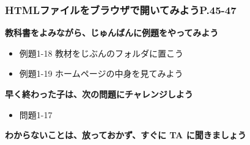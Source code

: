 \documentclass[dvipdfmx]{beamer}
\begin{document}
\begin{frame}[fragile]
	\frametitle{\large{HTMLファイルをブラウザで開いてみようP.45-47}~~~}
      \large\textbf{教科書をよみながら、じゅんばんに例題をやってみよう}
				\begin{itemize}
					\item 例題1-18 教材をじぶんのフォルダに置こう
					\item 例題1-19 ホームページの中身を見てみよう
				\end{itemize}
      \vfill
      \large\textbf{早く終わった子は、次の問題にチャレンジしよう}
      \begin{itemize}
        \item 問題1-17
      \end{itemize}
      \vfill
      \large\textbf{わからないことは、放っておかず、すぐに TA に聞きましょう}
\end{frame}
\end{document}
